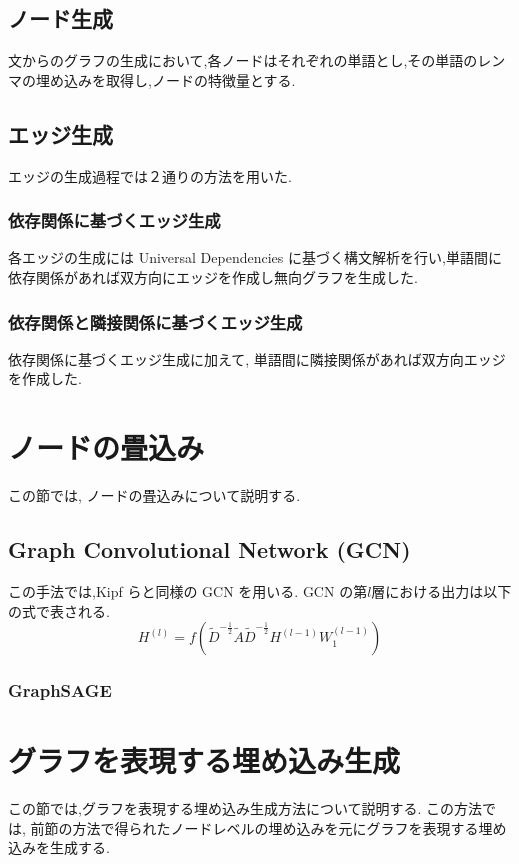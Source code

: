 \documentclass[a4j,twoside,12pt, dvipdfmx]{thesis} %
\begin{document}
\subsection{ノード生成}\label{meth:createNode}
文からのグラフの生成において,各ノードはそれぞれの単語とし,その単語のレンマの埋め込みを取得し,ノードの特徴量とする.

\subsection{エッジ生成}\label{meth:createEdge}
エッジの生成過程では２通りの方法を用いた.
\subsubsection{依存関係に基づくエッジ生成}
各エッジの生成には Universal Dependencies に基づく構文解析を行い,単語間に依存関係があれば双方向にエッジを作成し無向グラフを生成した.

\subsubsection{依存関係と隣接関係に基づくエッジ生成}
依存関係に基づくエッジ生成に加えて, 単語間に隣接関係があれば双方向エッジを作成した.

\section{ノードの畳込み}\label{meth:convNode}
この節では, ノードの畳込みについて説明する.

\subsection{Graph Convolutional Network (GCN)}
この手法では,Kipf ら\cite{kipf2017semi}と同様の GCN を用いる.
GCN の第$l$層における出力は以下の式で表される.
\begin{equation}H^{(l)}=f(\tilde{D}^{-\frac{1}{2}}\tilde{A}\tilde{D}^{-\frac{1}{2}}H^{(l-1)}W_{1}^{(l-1)})\end{equation}

\subsubsection{GraphSAGE}


\section{グラフを表現する埋め込み生成}\label{meth:createEmbedding}
この節では,グラフを表現する埋め込み生成方法について説明する.
この方法では, 前節の方法で得られたノードレベルの埋め込みを元にグラフを表現する埋め込みを生成する.
\end{document}
